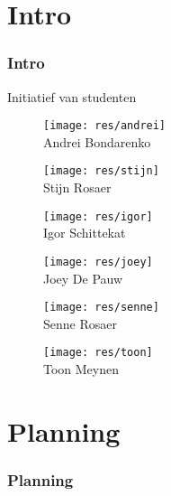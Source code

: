 	\section{Intro}
    \addtocounter{minutes}{2}
	\begin{frame}
		\frametitle{Intro} 
        Initiatief van studenten
        
        \begin{figure}
        	\begin{minipage}{0.3\linewidth}
                \centering
            	\texttt{[image: res/andrei]} \\
            	\footnotesize Andrei Bondarenko
            \end{minipage}
            \begin{minipage}{0.3\linewidth}
            	\centering
				\texttt{[image: res/stijn]} \\
            	\footnotesize Stijn Rosaer
        	\end{minipage}
            \begin{minipage}{0.3\linewidth}
            	\centering
				\texttt{[image: res/igor]} \\
            	\footnotesize Igor Schittekat 
        	\end{minipage}
            \begin{minipage}{0.3\linewidth}
            	\centering
				\texttt{[image: res/joey]} \\
            	\footnotesize Joey De Pauw
        	\end{minipage}
            \begin{minipage}{0.3\linewidth}
            	\centering
				\texttt{[image: res/senne]} \\
            	\footnotesize Senne Rosaer
        	\end{minipage}
            \begin{minipage}{0.3\linewidth}
            	\centering
				\texttt{[image: res/toon]} \\
            	\footnotesize Toon Meynen
        	\end{minipage}
        \end{figure}
        
	\end{frame}  
   
    
    \section{Planning}
    \addtocounter{minutes}{3}
	\begin{frame}
		\frametitle{Planning}
        
	\end{frame}
    
